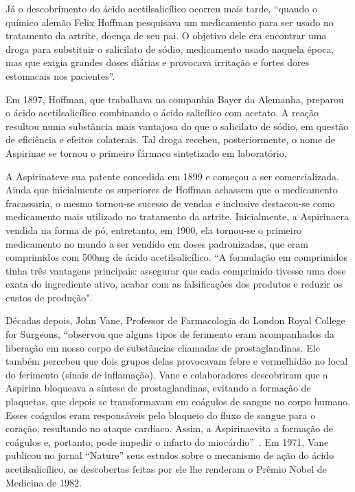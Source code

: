 Já o descobrimento do ácido acetilsalicílico ocorreu mais tarde, “quando o químico alemão Felix
Hoffman pesquisava um medicamento para ser usado no tratamento da artrite, doença de seu pai. O
objetivo dele era encontrar uma droga para substituir o salicilato de sódio, medicamento usado
naquela época, mas que exigia grandes doses diárias e provocava irritação e fortes dores estomacais
nos pacientes”.~\cite{massabni2006}

Em 1897, Hoffman, que trabalhava na companhia Bayer da Alemanha, preparou o ácido acetilsalicílico
combinando o ácido salicílico com acetato. A reação resultou numa substância mais vantajosa do que o
salicilato de sódio, em questão de eficiência e efeitos colaterais. Tal droga recebeu,
posteriormente, o nome de Aspirina\R e se tornou o primeiro fármaco sintetizado em laboratório.  

A Aspirina\R teve sua patente concedida em 1899 e começou a ser comercializada.  Ainda que
inicialmente os superiores de Hoffman achassem que o medicamento fracassaria, o mesmo tornou-se
sucesso de vendas e inclusive destacou-se como medicamento mais utilizado no tratamento da artrite.
Inicialmente, a Aspirina\R era vendida na forma de pó, entretanto, em 1900, ela tornou-se o primeiro
medicamento no mundo a ser vendido em doses padronizadas, que eram comprimidos com 500mg de ácido
acetilsalicílico. “A formulação em comprimidos tinha três vantagens principais: assegurar que cada
comprimido tivesse uma dose exata do ingrediente ativo, acabar com as falsificações dos produtos e
reduzir os custos de produção".~\cite{aspirinabayer}

Décadas depois, John Vane, Professor de Farmacologia do London Royal College for Surgeons, “observou
que alguns tipos de ferimento eram acompanhados da liberação em nosso corpo de substâncias chamadas
de prostaglandinas. Ele também percebeu que dois grupos delas provocavam febre e vermelhidão no
local do ferimento (sinais de inflamação). Vane e colaboradores descobriram que a Aspirina\R
bloqueava a síntese de prostaglandinas, evitando a formação de plaquetas, que depois se
transformavam em coágulos de sangue no corpo humano. Esses coágulos eram responsáveis pelo bloqueio
do fluxo de sangue para o coração, resultando no ataque cardíaco. Assim, a Aspirina\R evita a
formação de coágulos e, portanto, pode impedir o infarto do miocárdio”~\cite{massabni2006}. Em 1971,
Vane publicou no jornal “Nature” seus estudos sobre o mecanismo de ação do ácido acetilsalicílico,
as descobertas feitas por ele lhe renderam o Prêmio Nobel de Medicina de 1982. 

